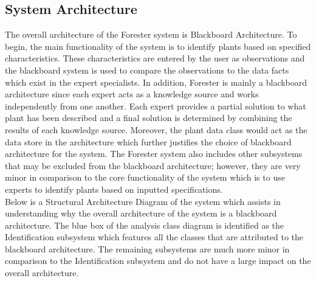\documentclass[]{article}
\begin{document}
\subsection{System Architecture}
\label{sub:system_architecture}
	 The overall architecture of the Forester system is Blackboard Architecture. To begin, the main functionality of the system is to identify plants based on specified characteristics. These characteristics are entered by the user as observations and the blackboard system is used to compare the observations to the data facts which exist in the expert specialists. In addition, Forester is mainly a blackboard architecture since each expert acts as a knowledge source and works independently from one another. Each expert provides a partial solution to what plant has been described and a final solution is determined by combining the results of each knowledge source. Moreover, the plant data class would act as the data store in the architecture which further justifies the choice of blackboard architecture for the system. The Forester system also includes other subsystems that may be excluded from the blackboard architecture; however, they are very minor in comparison to the core functionality of the system which is to use experts to identify plants based on inputted specifications.\\
	 Below is a Structural Architecture Diagram of the system which assists in understanding why the overall architecture of the system is a blackboard architecture. The blue box of the analysis class diagram is identified as the Identification subsystem which features all the classes that are attributed to the blackboard architecture. The remaining subsystems are much more minor in comparison to the Identification subsystem and do not have a large impact on the overall architecture.
	
\end{document}

